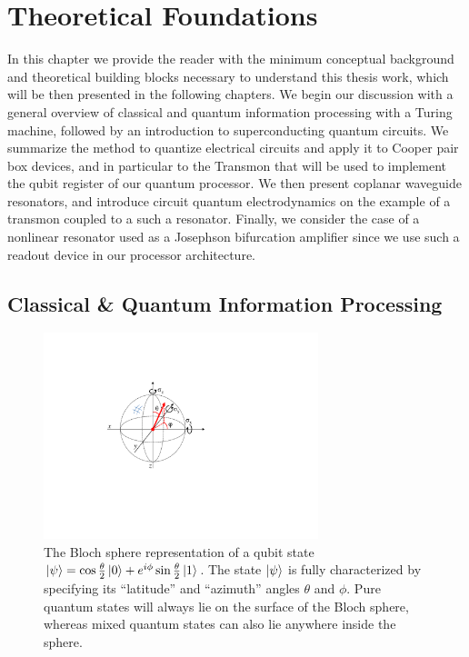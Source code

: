 \chapter{Theoretical Foundations} \label{chapter:theory}

In this chapter we provide the reader with the minimum conceptual background and theoretical building blocks necessary  to understand this thesis work, which will be then presented in the following chapters. We begin our discussion with a general overview of classical and quantum information processing with a Turing machine, followed by an introduction to superconducting quantum circuits. We summarize the method to quantize electrical circuits and apply it to Cooper pair box devices, and in particular to the Transmon that will be used to implement the qubit register of our quantum processor. We then present coplanar waveguide resonators, and introduce circuit quantum electrodynamics on the example of a transmon coupled to a such a resonator. Finally, we consider the case of a nonlinear resonator used as a Josephson bifurcation amplifier since we use such a readout device in our processor architecture.

\section{Classical \& Quantum Information Processing}

\begin{figure}
	\includegraphics[width=8cm]{"./material/figures/introduction/bloch_sphere"}
	\caption{The Bloch sphere representation of a qubit state $\left| \psi \right> = \cos{\frac{\theta}{2}}\left| 0 \right>+e^{i\phi}\sin{\frac{\theta}{2}}\left| 1 \right>$. The state $\left| \psi \right>$ is fully characterized by specifying its ``latitude'' and ``azimuth'' angles $\theta$ and $\phi$. Pure quantum states will always lie on the surface of the Bloch sphere, whereas mixed quantum states can also lie anywhere inside the sphere.}
	\label{fig:BlochSphere}
\end{figure}

